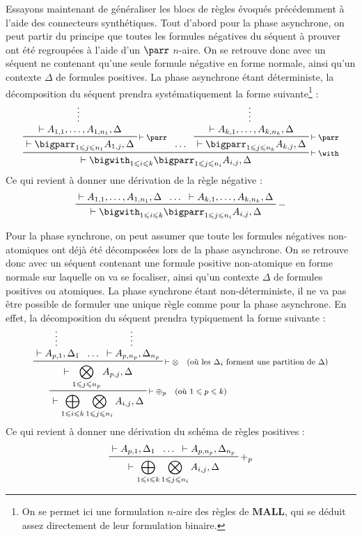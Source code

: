 \documentclass[12pt]{report}
\newcommand{\seq}{\vdash}
\newcommand{\irule}[1]{\footnotesize$#1$}
\newcommand{\iruleR}[1]{\irule{\seq{#1}}}
\begin{document}
Essayons maintenant de généraliser les blocs de règles évoqués précédemment à l'aide des connecteurs synthétiques. Tout d'abord pour la phase asynchrone, on peut partir du principe que toutes les formules négatives du séquent à prouver ont été regroupées à l'aide d'un $\parr$ $n$-aire. On se retrouve donc avec un séquent ne contenant qu'une seule formule négative en forme normale, ainsi qu'un contexte $\Delta$ de formules positives. La phase asynchrone étant déterministe, la décomposition du séquent prendra systématiquement la forme suivante\footnote{On se permet ici une formulation $n$-aire des règles de $\mathbf{MALL}$, qui se déduit assez directement de leur formulation binaire.} :
\begin{displaymath}
	\prftree[r]{\iruleR{\with}}
		{\prftree[r]{\iruleR{\parr}}
			{\prfsummary{\seq A_{1,1},\ldots,A_{1,n_1},\Delta}}
			{\seq \bigparr_{1 \leqslant j \leqslant n_1} A_{1,j},\Delta}}
		{\ldots}
		{\prftree[r]{\iruleR{\parr}}
			{\prfsummary{\seq A_{k,1},\ldots,A_{k,n_k},\Delta}}
			{\seq \bigparr_{1 \leqslant j \leqslant n_k} A_{k,j},\Delta}}
		{\seq \bigwith_{1 \leqslant i \leqslant k} \bigparr_{1 \leqslant j \leqslant n_i} A_{i,j},\Delta}
\end{displaymath}
Ce qui revient à donner une dérivation de la règle négative :
\begin{displaymath}
	\prftree[r]{$-$}
		{\seq A_{1,1},\ldots,A_{1,n_1},\Delta}
		{\ldots}
		{\seq A_{k,1},\ldots,A_{k,n_k},\Delta}
		{\seq \bigwith_{1 \leqslant i \leqslant k} \bigparr_{1 \leqslant j \leqslant n_i} A_{i,j},\Delta}
\end{displaymath}

Pour la phase synchrone, on peut assumer que toute les formules négatives non-atomiques ont déjà été décomposées lors de la phase asynchrone. On se retrouve donc avec un séquent contenant une formule positive non-atomique en forme normale sur laquelle on va se focaliser, ainsi qu'un contexte $\Delta$ de formules positives ou atomiques. La phase synchrone étant non-déterministe, il ne va pas être possible de formuler une unique règle comme pour la phase asynchrone. En effet, la décomposition du séquent prendra typiquement la forme suivante :
\begin{displaymath}
	\prftree[r]{\iruleR{\oplus_p \quad (\text{où } 1 \leqslant p \leqslant k)}}
		{\prftree[r]{\iruleR{\otimes \quad (\text{où les } \Delta_i \text{ forment une partition de } \Delta)}}
			{\prfsummary{\seq A_{p,1},\Delta_1}}
			{\ldots}
			{\prfsummary{\seq A_{p,n_p},\Delta_{n_p}}}
			{\seq \bigotimes_{1 \leqslant j \leqslant n_p} A_{p,j},\Delta}}
		{\seq \bigoplus_{1 \leqslant i \leqslant k} \bigotimes_{1 \leqslant j \leqslant n_i} A_{i,j},\Delta}
\end{displaymath}
Ce qui revient à donner une dérivation du schéma de règles positives :
\begin{displaymath}
	\prftree[r]{$+_p$}
		{\seq A_{p,1},\Delta_1}
		{\ldots}
		{\seq A_{p,n_p},\Delta_{n_p}}
	{\seq \bigoplus_{1 \leqslant i \leqslant k} \bigotimes_{1 \leqslant j \leqslant n_i} A_{i,j},\Delta}
\end{displaymath}
\end{document}
